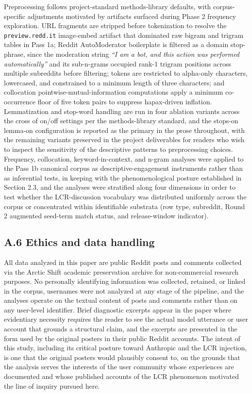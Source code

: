 \documentclass[11pt]{article}
\begin{document}
Preprocessing follows project-standard methods-library defaults, with corpus-specific adjustments motivated by artifacts surfaced during Phase 2 frequency exploration. URL fragments are stripped before tokenization to resolve the \texttt{preview.redd.it} image-embed artifact that dominated raw bigram and trigram tables in Pass 1a; Reddit AutoModerator boilerplate is filtered as a domain stop-phrase, since the moderation string \emph{``I am a bot, and this action was performed automatically''} and its sub-n-grams occupied rank-1 trigram positions across multiple subreddits before filtering; tokens are restricted to alpha-only characters, lowercased, and constrained to a minimum length of three characters; and collocation pointwise-mutual-information computations apply a minimum co-occurrence floor of five token pairs to suppress hapax-driven inflation. Lemmatization and stop-word handling are run in four ablation variants across the cross of on/off settings per the methods-library standard, and the stops-on lemma-on configuration is reported as the primary in the prose throughout, with the remaining variants preserved in the project deliverables for readers who wish to inspect the sensitivity of the descriptive patterns to preprocessing choices. Frequency, collocation, keyword-in-context, and n-gram analyses were applied to the Pass 1b canonical corpus as descriptive-engagement instruments rather than as inferential tests, in keeping with the phenomenological posture established in Section 2.3, and the analyses were stratified along four dimensions in order to test whether the LCR-discussion vocabulary was distributed uniformly across the corpus or concentrated within identifiable substrata (row type, subreddit, Round 2 augmented seed-term match status, and release-window indicator).

\subsection*{A.6 Ethics and data handling}

All data analyzed in this paper are public Reddit posts and comments collected via the Arctic Shift academic preservation archive for non-commercial research purposes. No personally identifying information was collected, retained, or linked in the corpus, usernames were not analyzed at any stage of the pipeline, and the analyses operate on the textual content of posts and comments rather than on any user-level identifier. Brief diagnostic excerpts appear in the paper where evidentiary necessity requires the reader to see the actual model utterance or user account that grounds a structural claim, and the excerpts are presented in the form used by the original posters in their public Reddit accounts. The intent of this study, including its critical posture toward Anthropic and the LCR injection, is one that the original posters would plausibly consent to, on the grounds that the analysis serves the interests of the user community whose experiences are documented and whose published accounts of the LCR phenomenon motivated the line of inquiry pursued here.
\end{document}
